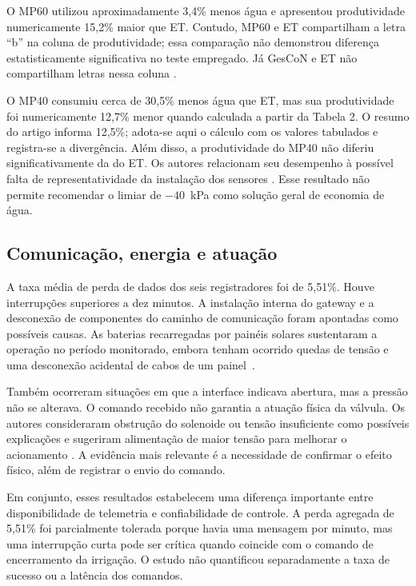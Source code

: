 \documentclass[11pt,a4paper]{article}
\begin{document}
O MP60 utilizou aproximadamente 3,4\% menos água e apresentou produtividade numericamente 15,2\% maior que ET. Contudo, MP60 e ET compartilham a letra ``b'' na coluna de produtividade; essa comparação não demonstrou diferença estatisticamente significativa no teste empregado. Já GesCoN e ET não compartilham letras nessa coluna \cite{zhang2022}.

O MP40 consumiu cerca de 30,5\% menos água que ET, mas sua produtividade foi numericamente 12,7\% menor quando calculada a partir da Tabela 2. O resumo do artigo informa 12,5\%; adota-se aqui o cálculo com os valores tabulados e registra-se a divergência. Além disso, a produtividade do MP40 não diferiu significativamente da do ET. Os autores relacionam seu desempenho à possível falta de representatividade da instalação dos sensores \cite{zhang2022}. Esse resultado não permite recomendar o limiar de $-40$~kPa como solução geral de economia de água.

\subsection{Comunicação, energia e atuação}
A taxa média de perda de dados dos seis registradores foi de 5,51\%. Houve interrupções superiores a dez minutos. A instalação interna do gateway e a desconexão de componentes do caminho de comunicação foram apontadas como possíveis causas. As baterias recarregadas por painéis solares sustentaram a operação no período monitorado, embora tenham ocorrido quedas de tensão e uma desconexão acidental de cabos de um painel~\cite{zhang2022}.

Também ocorreram situações em que a interface indicava abertura, mas a pressão não se alterava. O comando recebido não garantia a atuação física da válvula. Os autores consideraram obstrução do solenoide ou tensão insuficiente como possíveis explicações e sugeriram alimentação de maior tensão para melhorar o acionamento \cite{zhang2022}. A evidência mais relevante é a necessidade de confirmar o efeito físico, além de registrar o envio do comando.

Em conjunto, esses resultados estabelecem uma diferença importante entre disponibilidade de telemetria e confiabilidade de controle. A perda agregada de 5,51\% foi parcialmente tolerada porque havia uma mensagem por minuto, mas uma interrupção curta pode ser crítica quando coincide com o comando de encerramento da irrigação. O estudo não quantificou separadamente a taxa de sucesso ou a latência dos comandos.
\end{document}
